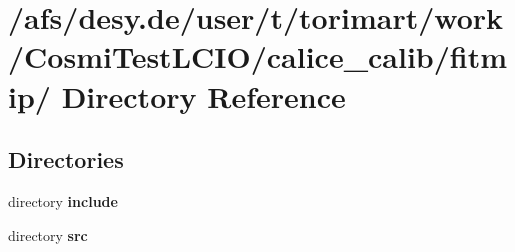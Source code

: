 \section{/afs/desy.de/user/t/torimart/work/CosmiTestLCIO/calice\_\-calib/fitmip/ Directory Reference}
\label{dir_8b66d6ab1bfe1b4e4607d2386115a489}
\subsection*{Directories}
\begin{DoxyCompactItemize}
\item 
directory {\bf include}
\item 
directory {\bf src}
\end{DoxyCompactItemize}
